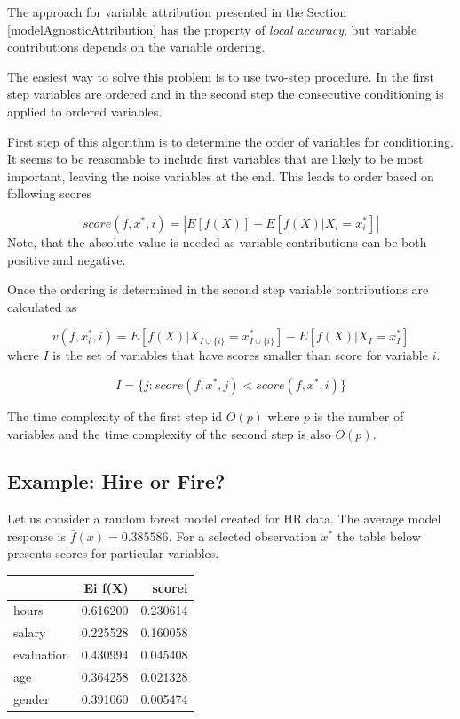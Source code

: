 \documentclass[]{krantz}
\theoremstyle{definition}
\theoremstyle{definition}
\theoremstyle{definition}
\theoremstyle{remark}
\begin{document}
The approach for variable attribution presented in the Section
\ref{modelAgnosticAttribution} has the property of \emph{local
accuracy}, but variable contributions depends on the variable ordering.

The easiest way to solve this problem is to use two-step procedure. In
the first step variables are ordered and in the second step the
consecutive conditioning is applied to ordered variables.

First step of this algorithm is to determine the order of variables for
conditioning. It seems to be reasonable to include first variables that
are likely to be most important, leaving the noise variables at the end.
This leads to order based on following scores

\[
score(f, x^*, i) = \left| E [f(X)] - E [f(X)|X_i = x^*_i] \right|
\] Note, that the absolute value is needed as variable contributions can
be both positive and negative.

Once the ordering is determined in the second step variable
contributions are calculated as

\[
v(f, x^*_i, i) = E [f(X) | X_{I \cup \{i\}} = x_{I \cup \{i\}}^*] - E [f(X) | X_{I} = x_{I}^*] 
\] where \(I\) is the set of variables that have scores smaller than
score for variable \(i\).

\[
I = \{j: score(f, x^*, j) < score(f, x^*, i)\}
\]

The time complexity of the first step id \(O(p)\) where \(p\) is the
number of variables and the time complexity of the second step is also
\(O(p)\).

\hypertarget{example-hire-or-fire}{%
\subsection{Example: Hire or Fire?}\label{example-hire-or-fire}}

Let us consider a random forest model created for HR data. The average
model response is \(\bar f(x) = 0.385586\). For a selected observation
\(x^*\) the table below presents scores for particular variables.

\begin{longtable}[]{@{}lrr@{}}
\toprule
& Ei f(X) & scorei\tabularnewline
\midrule
\endhead
hours & 0.616200 & 0.230614\tabularnewline
salary & 0.225528 & 0.160058\tabularnewline
evaluation & 0.430994 & 0.045408\tabularnewline
age & 0.364258 & 0.021328\tabularnewline
gender & 0.391060 & 0.005474\tabularnewline
\bottomrule
\end{longtable}
\end{document}
